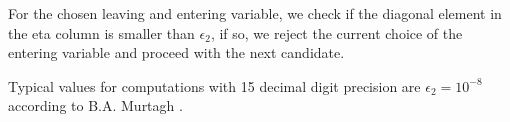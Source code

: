 For the chosen leaving and entering variable, 
we check if the diagonal element in the eta column is smaller than $\epsilon_2$, if so,
we reject the current choice of the entering variable and proceed with the next candidate.

Typical values for computations with 15 decimal digit precision are $\epsilon_2 = 10^{-8}$
according to B.A. Murtagh \parencite{murtagh1981advanced}. 


